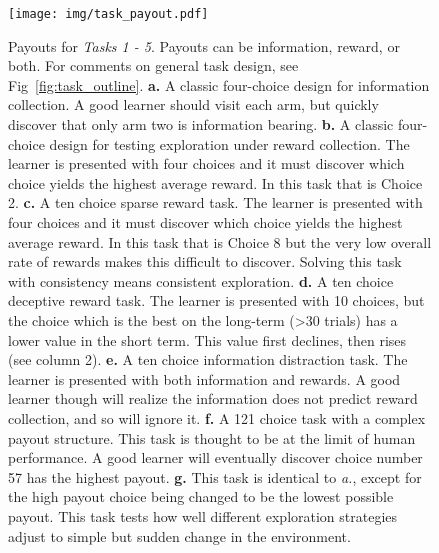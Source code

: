 \begin{figure}
	\begin{fullwidth}
	\texttt{[image: img/task\_payout.pdf]} 
	\caption{Payouts for \textit{Tasks 1 - 5}. Payouts can be information, reward, or both. For comments on general task design, see Fig~\ref{fig:task_outline}.
	\textbf{a.} A classic four-choice design for information collection. A good learner should visit each arm, but quickly discover that only arm two is information bearing.
	\textbf{b.} A classic four-choice design for testing exploration under reward collection. The learner is presented with four choices and it must discover which choice yields the highest average reward. In this task that is Choice 2. 
	\textbf{c.} A ten choice sparse reward task. The learner is presented with four choices and it must discover which choice yields the highest average reward. In this task that is Choice 8 but the very low overall rate of rewards makes this difficult to discover. Solving this task with consistency means consistent exploration. 
	\textbf{d.} A ten choice deceptive reward task. The learner is presented with 10 choices, but the choice which is the best on the long-term (>30 trials) has a lower value in the short term. This value first declines, then rises (see column 2).
	\textbf{e.} A ten choice information distraction task. The learner is presented with both information and rewards. A good learner though will realize the information does not predict reward collection, and so will ignore it.
	\textbf{f.} A 121 choice task with a complex payout structure. This task is thought to be at the limit of human performance. A good learner will eventually discover choice number 57 has the highest payout.
	\textbf{g.} This task is identical to \textit{a.}, except for the high payout choice being changed to be the lowest possible payout. This task tests how well different exploration strategies adjust to simple but sudden change in the environment.
	}
	\label{fig:payout} 
	\end{fullwidth}
\end{figure}

